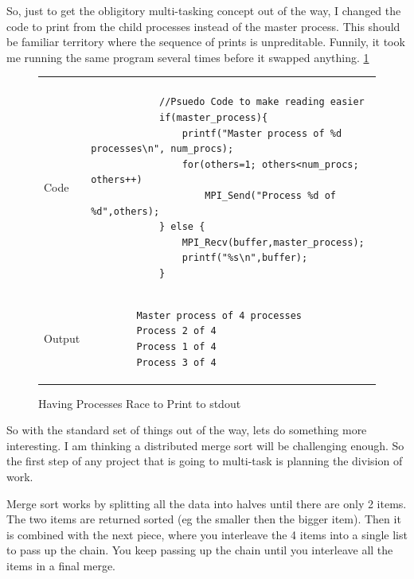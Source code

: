 \documentclass[12pt]{article}
\begin{document}
So, just to get the obligitory multi-tasking concept out of the way, I changed the code to print from the child processes instead of the master process.
This should be familiar territory where the sequence of prints is unpreditable.
Funnily, it took me running the same program several times before it swapped anything. \ref{out_of_order_printing}

\begin{figure}[htb]
	\centering
	\begin{tabular}{ l|@{\hskip 16pt}l }
		\hline \\
		Code &
		\begin{minipage}[t]{0.8\textwidth}
		\vspace{-20pt}
		\begin{verbatim}
			//Psuedo Code to make reading easier
			if(master_process){
				printf("Master process of %d processes\n", num_procs);
				for(others=1; others<num_procs; others++)
					MPI_Send("Process %d of %d",others);
			} else {
				MPI_Recv(buffer,master_process);
				printf("%s\n",buffer);
			}
		\end{verbatim}
		\end{minipage}
		\\ \hline
		Output &
		\begin{minipage}[t]{0.8\textwidth}
		\begin{verbatim}
		Master process of 4 processes
		Process 2 of 4
		Process 1 of 4
		Process 3 of 4
		\end{verbatim}
		\end{minipage}
		\\ \hline
	\end{tabular}
	\caption{Having Processes Race to Print to stdout}
	\label{out_of_order_printing}
\end{figure}

\newpage
So with the standard set of things out of the way, lets do something more interesting.
I am thinking a distributed merge sort will be challenging enough.
So the first step of any project that is going to multi-task is planning the division of work.

Merge sort works by splitting all the data into halves until there are only 2 items.
The two items are returned sorted (eg the smaller then the bigger item).
Then it is combined with the next piece, where you interleave the 4 items into a single list to pass up the chain.
You keep passing up the chain until you interleave all the items in a final merge.
\end{document}
